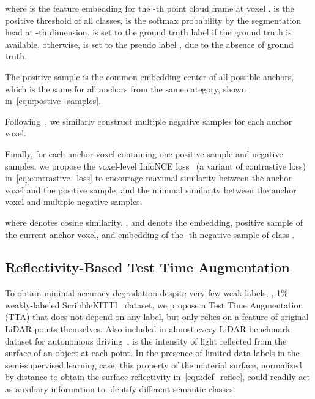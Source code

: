 \documentclass[10pt,twocolumn,letterpaper]{article}
\begin{document}
where  is the feature embedding for the -th point cloud frame at voxel ,  is the positive threshold of all classes,  is the softmax probability by the segmentation head at -th dimension. 
 is set to the ground truth label  if the ground truth is available, otherwise,  is set to the pseudo label , due to the absence of ground truth.


The positive sample is the common embedding center of all possible anchors, which is the same for all anchors from the same category, shown in~\cref{equ:postive_samples}.

Following~\cite{wang2022semisupervised}, we similarly construct multiple negative samples  for each anchor voxel.




Finally, for each anchor voxel containing one positive sample and  negative samples, we propose the voxel-level InfoNCE loss~\cite{oord2019representation} (a variant of contrastive loss)  in~\cref{eq:contrastive_loss} to encourage maximal similarity between the anchor voxel and the positive sample, and the minimal similarity between the anchor voxel and multiple negative samples.

where  denotes cosine similarity. ,  and  denote the embedding, positive sample of the current anchor voxel, and embedding of the -th negative sample of class . 










\subsection{Reflectivity-Based Test Time Augmentation}

\noindent To obtain minimal accuracy degradation despite very few weak labels, \eg, 1\% weakly-labeled ScribbleKITTI~\cite{Unal_2022_CVPR} dataset, we propose a Test Time Augmentation (TTA) that does not depend on any label, but only relies on a feature of original LiDAR points themselves. Also included in almost every LiDAR benchmark dataset for autonomous driving~\cite{Geiger2012,behley2019semantickittia,nuscenes2019,lyft2019,li2021durlara,Unal_2022_CVPR}, is the intensity of light reflected from the surface of an object at each point. In the presence of limited data labels in the semi-supervised learning case, this property of the material surface, normalized by distance to obtain the surface reflectivity in~\cref{equ:def_reflec}, could readily act as auxiliary information to identify different semantic classes. 
\end{document}
